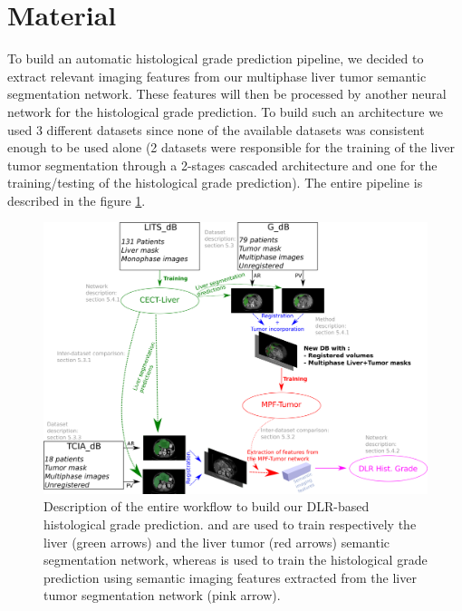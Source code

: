 \section{Material}


To build an automatic histological grade prediction pipeline, we decided to extract relevant imaging features from our multiphase liver tumor semantic segmentation network. These features will then be processed by another neural network for the histological grade prediction. To build such an architecture we used 3 different datasets since none of the available datasets was consistent enough to be used alone (2 datasets were responsible for the training of the liver tumor segmentation through a 2-stages cascaded architecture and one for the training/testing of the histological grade prediction). The entire pipeline is described in the figure \ref{fig:DLR_pipeline_withDB}.
\begin{figure}[ht!]
	\centering
	\includegraphics[width=0.9\linewidth]{../HistologicalGradePrediction/images/DLR_pipeline_withDB}
	\caption{Description of the entire workflow to build our DLR-based histological grade prediction. \textbf{} and \textbf{} are used to train respectively the liver (green arrows) and the liver tumor (red arrows) semantic segmentation network, whereas \textbf{} is used to train the histological grade prediction using semantic imaging features extracted from the liver tumor segmentation network (pink arrow).}
	\label{fig:DLR_pipeline_withDB}
\end{figure}

